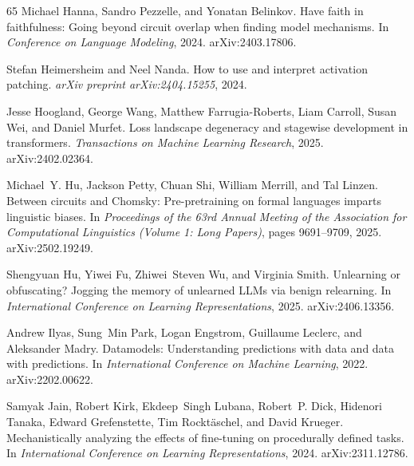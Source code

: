 \begin{thebibliography}{65}
Michael Hanna, Sandro Pezzelle, and Yonatan Belinkov.
\newblock Have faith in faithfulness: Going beyond circuit overlap when finding model mechanisms.
\newblock In \emph{Conference on Language Modeling}, 2024.
\newblock arXiv:2403.17806.

Stefan Heimersheim and Neel Nanda.
\newblock How to use and interpret activation patching.
\newblock \emph{arXiv preprint arXiv:2404.15255}, 2024.

Jesse Hoogland, George Wang, Matthew Farrugia-Roberts, Liam Carroll, Susan Wei, and Daniel Murfet.
\newblock Loss landscape degeneracy and stagewise development in transformers.
\newblock \emph{Transactions on Machine Learning Research}, 2025.
\newblock arXiv:2402.02364.

Michael~Y. Hu, Jackson Petty, Chuan Shi, William Merrill, and Tal Linzen.
\newblock Between circuits and Chomsky: Pre-pretraining on formal languages imparts linguistic biases.
\newblock In \emph{Proceedings of the 63rd Annual Meeting of the Association for Computational Linguistics (Volume 1: Long Papers)}, pages 9691--9709, 2025{}.
\newblock arXiv:2502.19249.

Shengyuan Hu, Yiwei Fu, Zhiwei~Steven Wu, and Virginia Smith.
\newblock Unlearning or obfuscating? Jogging the memory of unlearned LLMs via benign relearning.
\newblock In \emph{International Conference on Learning Representations}, 2025{}.
\newblock arXiv:2406.13356.

Andrew Ilyas, Sung~Min Park, Logan Engstrom, Guillaume Leclerc, and Aleksander
  Madry.
\newblock Datamodels: Understanding predictions with data and data with predictions.
\newblock In \emph{International Conference on Machine Learning}, 2022.
\newblock arXiv:2202.00622.

Samyak Jain, Robert Kirk, Ekdeep~Singh Lubana, Robert~P. Dick, Hidenori Tanaka, Edward Grefenstette, Tim Rockt{\"a}schel, and David Krueger.
\newblock Mechanistically analyzing the effects of fine-tuning on procedurally defined tasks.
\newblock In \emph{International Conference on Learning Representations}, 2024.
\newblock arXiv:2311.12786.


\end{thebibliography}
